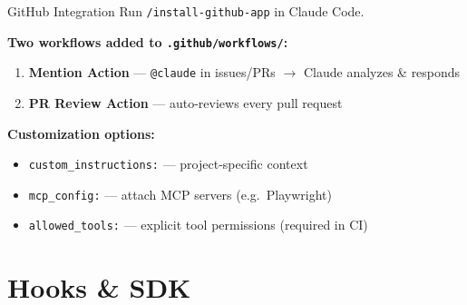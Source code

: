 \documentclass[aspectratio=169]{beamer}
\begin{document}
\begin{frame}{GitHub Integration}
Run \texttt{/install-github-app} in Claude Code.

\bigskip
\textbf{Two workflows added to \texttt{.github/workflows/}:}
\begin{enumerate}
  \item \textbf{Mention Action} --- \texttt{@claude} in issues/PRs $\to$ Claude analyzes \& responds
  \item \textbf{PR Review Action} --- auto-reviews every pull request
\end{enumerate}

\bigskip
\textbf{Customization options:}
\begin{itemize}
  \item \texttt{custom\_instructions:} --- project-specific context
  \item \texttt{mcp\_config:} --- attach MCP servers (e.g.\ Playwright)
  \item \texttt{allowed\_tools:} --- explicit tool permissions (required in CI)
\end{itemize}
\end{frame}

\section{Hooks \& SDK}
\end{document}
